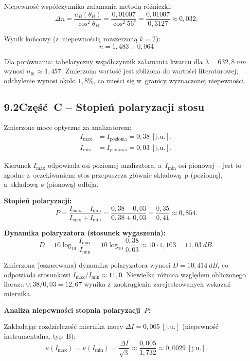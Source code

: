 \documentclass[a4paper,12pt]{article}
\begin{document}
Niepewność współczynnika załamania metodą różniczki:
\[
  \Delta n
  = \frac{u_B(\theta_B)}{\cos^2\!\theta_B}
  = \frac{0{,}01007}{\cos^2\!56^\circ}
  = \frac{0{,}01007}{0{,}3127}
  \approx 0{,}032.
\]

Wynik końcowy (z~niepewnością rozszerzoną $k = 2$):
\[
  \boxed{n = 1{,}483 \pm 0{,}064}
\]

\noindent Dla porównania: tabelaryczny współczynnik załamania kwarcu dla
$\lambda = 632{,}8\ \si{nm}$ wynosi $n_{\text{lit}} \approx 1{,}457$.
Zmierzona wartość jest zbliżona do wartości literaturowej; odchylenie wynosi
około $1{,}8\%$, co mieści się w~granicy wyznaczonej niepewności.

\subsection*{9.2\quad Część~C -- Stopień polaryzacji stosu}

\noindent Zmierzone moce optyczne za analizatorem:
\begin{align*}
  I_{\max} &= I_{\text{pozioma}} = 0{,}38\ [\text{j.u.}],\\
  I_{\min} &= I_{\text{pionowa}}  = 0{,}03\ [\text{j.u.}].
\end{align*}

Kierunek $I_{\max}$ odpowiada osi poziomej analizatora, a~$I_{\min}$ osi
pionowej -- jest to zgodne z~oczekiwaniem: stos przepuszcza głównie
składową~p (poziomą), a~składową~s (pionową) odbija.

\medskip
\noindent\textbf{Stopień polaryzacji:}
\[
  P = \frac{I_{\max} - I_{\min}}{I_{\max} + I_{\min}}
    = \frac{0{,}38 - 0{,}03}{0{,}38 + 0{,}03}
    = \frac{0{,}35}{0{,}41}
    \approx 0{,}854.
\]

\noindent\textbf{Dynamika polaryzatora (stosunek wygaszenia):}
\[
  D = 10\log_{10}\frac{I_{\max}}{I_{\min}}
  = 10\log_{10}\frac{0{,}38}{0{,}03}
  \approx 10 \cdot 1{,}103
  = 11{,}03\ \si{dB}.
\]

Zmierzona (oszacowana) dynamika polaryzatora wynosi $D = 10{,}414\ \si{dB}$,
co odpowiada stosunkowi $I_{\max}/I_{\min} \approx 11{,}0$. Niewielka
różnica względem obliczonego ilorazu $0{,}38/0{,}03 = 12{,}67$ wynika
z~zaokrąglenia zarejestrowanych wskazań miernika.

\medskip
\noindent\textbf{Analiza niepewności stopnia polaryzacji~$P$:}

Zakładając rozdzielczość miernika mocy $\Delta I = 0{,}005\ [\text{j.u.}]$
(niepewność instrumentalna, typ~B):
\[
  u(I_{\max}) = u(I_{\min}) = \frac{\Delta I}{\sqrt{3}}
  \approx \frac{0{,}005}{1{,}732}
  \approx 0{,}0029\ [\text{j.u.}].
\]
\end{document}
